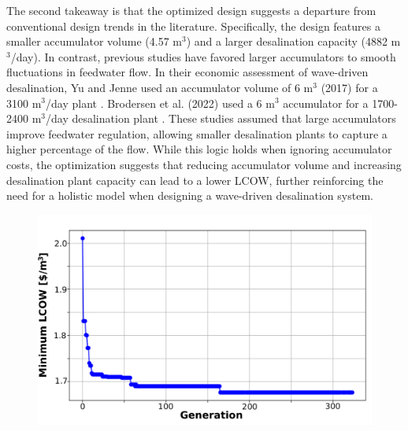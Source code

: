 \documentclass[twocolumn,10pt]{asme2e}
\begin{document}
The second takeaway is that the optimized design suggests a departure from conventional design trends in the literature. Specifically, the design features a smaller accumulator volume (4.57 m$^3$) and a larger desalination capacity (4882 m$^3$/day). In contrast, previous studies have favored larger accumulators to smooth fluctuations in feedwater flow. In their economic assessment of wave-driven desalination, Yu and Jenne used an accumulator volume of 6 m$^3$ (2017) for a 3100 m$^3$/day plant \cite{YJecon2017}. Brodersen et al. (2022) used a 6 m$^3$ accumulator for a 1700-2400 m$^3$/day desalination plant \cite{Brodersen2022}. These studies assumed that large accumulators improve feedwater regulation, allowing smaller desalination plants to capture a higher percentage of the flow. While this logic holds when ignoring accumulator costs, the optimization suggests that reducing accumulator volume and increasing desalination plant capacity can lead to a lower LCOW, further reinforcing the need for a holistic model when designing a wave-driven desalination system.

\begin{figure}
    \centering
    \includegraphics[width=\linewidth]{../figs/optimization_progress.pdf}
    \label{fig:convergence}
\end{figure}
\end{document}
